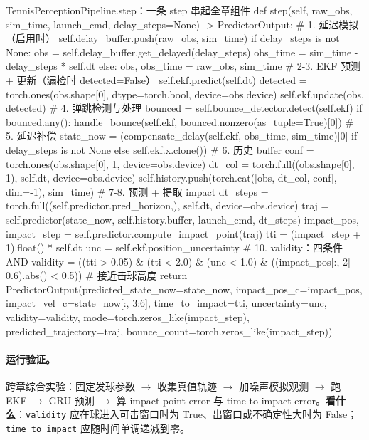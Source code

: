 \begin{codebox}[Python]{TennisPerceptionPipeline.step：一条 step 串起全章组件}
def step(self, raw_obs, sim_time, launch_cmd, delay_steps=None) -> PredictorOutput:
    # 1. 延迟模拟（启用时）
    self.delay_buffer.push(raw_obs, sim_time)
    if delay_steps is not None:
        obs = self.delay_buffer.get_delayed(delay_steps)
        obs_time = sim_time - delay_steps * self.dt
    else:
        obs, obs_time = raw_obs, sim_time
    # 2-3. EKF 预测 + 更新（漏检时 detected=False）
    self.ekf.predict(self.dt)
    detected = torch.ones(obs.shape[0], dtype=torch.bool, device=obs.device)
    self.ekf.update(obs, detected)
    # 4. 弹跳检测与处理
    bounced = self.bounce_detector.detect(self.ekf)
    if bounced.any():
        handle_bounce(self.ekf, bounced.nonzero(as_tuple=True)[0])
    # 5. 延迟补偿
    state_now = (compensate_delay(self.ekf, obs_time, sim_time)[0]
                 if delay_steps is not None else self.ekf.x.clone())
    # 6. 历史 buffer
    conf = torch.ones(obs.shape[0], 1, device=obs.device)
    dt_col = torch.full((obs.shape[0], 1), self.dt, device=obs.device)
    self.history.push(torch.cat([obs, dt_col, conf], dim=-1), sim_time)
    # 7-8. 预测 + 提取 impact
    dt_steps = torch.full((self.predictor.pred_horizon,), self.dt, device=obs.device)
    traj = self.predictor(state_now, self.history.buffer, launch_cmd, dt_steps)
    impact_pos, impact_step = self.predictor.compute_impact_point(traj)
    tti = (impact_step + 1).float() * self.dt
    unc = self.ekf.position_uncertainty
    # 10. validity：四条件 AND
    validity = ((tti > 0.05) & (tti < 2.0) & (unc < 1.0)
                & ((impact_pos[:, 2] - 0.6).abs() < 0.5))   # 接近击球高度
    return PredictorOutput(predicted_state_now=state_now, impact_pos_c=impact_pos,
        impact_vel_c=state_now[:, 3:6], time_to_impact=tti, uncertainty=unc,
        validity=validity, mode=torch.zeros_like(impact_step),
        predicted_trajectory=traj, bounce_count=torch.zeros_like(impact_step))
\end{codebox}

\paragraph{运行验证。}跨章综合实验：固定发球参数 $\to$ 收集真值轨迹 $\to$ 加噪声模拟观测 $\to$ 跑 EKF $\to$ GRU 预测 $\to$ 算 impact point error 与 time-to-impact error。\textbf{看什么}：\verb|validity| 应在球进入可击窗口时为 True、出窗口或不确定性大时为 False；\verb|time_to_impact| 应随时间单调递减到零。

